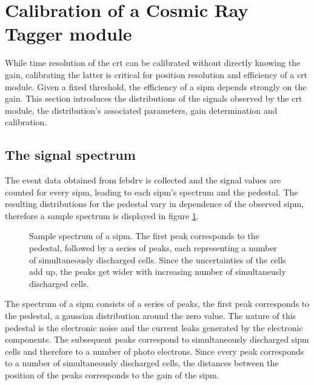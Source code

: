 \section{Calibration of a Cosmic Ray Tagger module}
While time resolution of the \gls{crt} can be calibrated without directly knowing the gain, calibrating the latter is critical for position resolution and efficiency of a \gls{crt} module.
Given a fixed threshold, the efficiency of a \gls{sipm} depends strongly on the gain.
This section introduces the distributions of the signals observed by the \gls{crt} module, the distribution's associated parameters, gain determination and calibration.

\subsection{The signal spectrum}

The event data obtained from febdrv is collected and the signal values are counted for every \gls{sipm}, leading to each \gls{sipm}'s spectrum and the pedestal.
The resulting distributions for the pedestal vary in dependence of the observed \gls{sipm}, therefore a sample spectrum is displayed in figure \ref{fig:cal_pedestal_spectrum}.

\begin{figure}
  \centering
  \caption{%
    Sample spectrum of a \gls{sipm}.
    The first peak corresponds to the pedestal, followed by a series of peaks, each representing a number of simultaneously discharged cells.
    Since the uncertainties of the cells add up, the peaks get wider with increasing number of simultaneusly discharged cells.
  }
  \label{fig:cal_pedestal_spectrum}
\end{figure}

The spectrum of a \gls{sipm} consists of a series of peaks, the first peak corresponds to the pedestal, a gaussian distribution around the zero value.
The nature of this pedestal is the electronic noise and the current leaks generated by the electronic components.
The subsequent peaks correspond to simultaneously discharged \gls{sipm} cells and therefore to a number of photo electrons.
Since every peak corresponds to a number of simultaneously discharged cells, the distances between the position of the peaks corresponds to the gain of the \gls{sipm}.

